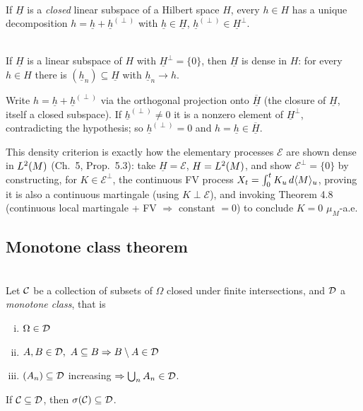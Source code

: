 \begin{theorem}  \\
If $\underline H$ is a \textit{closed} linear subspace of a Hilbert space $H$, every $h\in H$ has a unique decomposition $h=\underline h+\underline h^{(\perp)}$ with $\underline h\in\underline H$, $\underline h^{(\perp)}\in\underline H^\perp$.
\end{theorem}

\begin{corollary} \label{chap0:corollary-density_criterion}  \\
If $\underline H$ is a linear subspace of $H$ with $\underline H^\perp=\{0\}$, then $\underline H$ is dense in $H$: for every $h\in H$ there is $(\underline h_n)\subseteq\underline H$ with $\underline h_n\to h$.
\end{corollary}
\begin{proofidea} Write $h=\underline h+\underline h^{(\perp)}$ via the orthogonal projection onto $\overline{\underline H}$ (the closure of $\underline H$, itself a closed subspace). If $\underline h^{(\perp)}\ne0$ it is a nonzero element of $\underline H^\perp$, contradicting the hypothesis; so $\underline h^{(\perp)}=0$ and $h=\underline h\in\overline{\underline H}$. \end{proofidea}
\begin{usedin} This density criterion is exactly how the elementary processes $\mathcal E$ are shown dense in $L^2(M)$ (Ch.\ 5, Prop.\ 5.3): take $\underline H=\mathcal E$, $H=L^2(M)$, and show $\mathcal E^\perp=\{0\}$ by constructing, for $K\in\mathcal E^\perp$, the continuous FV process $X_t=\int_0^t K_u\,d\langle M\rangle_u$, proving it is also a continuous martingale (using $K\perp\mathcal E$), and invoking Theorem 4.8 (continuous local martingale + FV $\Rightarrow$ constant $=0$) to conclude $K=0$ $\mu_M$-a.e. \end{usedin}

\subsection{Monotone class theorem}
\begin{theorem} \label{chap0:theorem-monotone_class_sets}  \\
Let $\mathcal{C}$ be a collection of subsets of $\Omega$ closed under finite intersections, and $\mathcal{D}$ a \textit{monotone class}, that is
\begin{enumerate}[(i)]
    \item $\Omega\in\mathcal{D}$
    \item $A,B\in\mathcal{D},\ A\subseteq B \Rightarrow B\setminus A\in\mathcal{D}$
    \item $(A_n)\subseteq\mathcal{D}$ increasing $\Rightarrow \bigcup_n A_n\in\mathcal{D}$. 
\end{enumerate}
If $\mathcal{C}\subseteq\mathcal{D}$, then $\sigma(\mathcal{C})\subseteq\mathcal{D}$.
\end{theorem}

